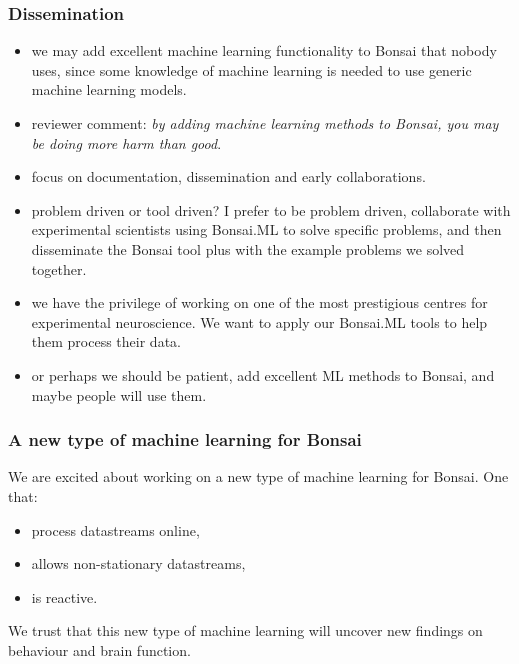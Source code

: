 \begin{frame}
    \frametitle{Dissemination}

    \begin{itemize}[<+->]

        \item we may add excellent machine learning functionality to Bonsai
            that nobody uses, since some knowledge of machine learning is needed
            to use generic machine learning models.

        \item reviewer comment: \emph{by adding machine learning methods
            to Bonsai, you may be doing more harm than good}.

        \item focus on documentation, dissemination and early collaborations.

        \item problem driven or tool driven? I prefer to be problem driven,
            collaborate with experimental scientists using Bonsai.ML to solve
            specific problems, and then disseminate the Bonsai tool plus with
            the example problems we solved together.

        \item we have the privilege of working on one of the most prestigious
            centres for experimental neuroscience. We want to apply our
            Bonsai.ML tools to help them process their data.

        \item or perhaps we should be patient, add excellent ML methods to
            Bonsai, and maybe people will use them.

    \end{itemize}

\end{frame}

\begin{frame}
    \frametitle{A new type of machine learning for Bonsai}

    We are excited about working on a new type of machine learning for Bonsai.
    One that:

    \begin{itemize}

        \item process datastreams online,

        \item allows non-stationary datastreams,

        \item is reactive.

    \end{itemize}

    We trust that this new type of machine learning will uncover new findings
    on behaviour and brain function.

\end{frame}
